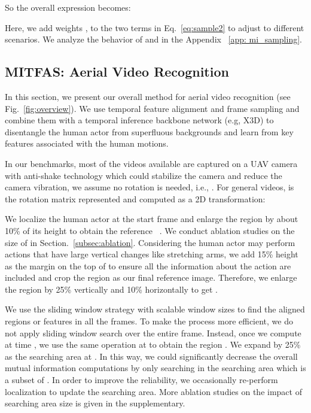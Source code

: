 \documentclass[10pt,twocolumn,letterpaper]{article}
\begin{document}
{So the overall expression becomes:

Here, we add weights , to the two terms in Eq.~\ref{eq:sample2} to adjust to different scenarios. We analyze the behavior of  and  in the Appendix ~\ref{app: mi_sampling}.

\subsection{MITFAS: Aerial Video Recognition} \label{subsec:MITFAS}
In this section, we present our overall method for aerial video recognition (see Fig.~\ref{fig:overview}). We use temporal feature alignment and frame sampling and combine them with a temporal inference backbone network (e.g, X3D\cite{feichtenhofer2020x3d}) to disentangle the human actor from superfluous backgrounds and learn from key features associated with the human motions.



In our benchmarks, most of the videos available are captured on a UAV camera with anti-shake technology which could stabilize the camera and reduce the camera vibration, we assume no rotation is needed, i.e., . For general videos,  is the rotation matrix represented and computed as a 2D transformation:


We localize the human actor at the start frame and enlarge the region by about 10\% of its height to obtain the reference  ~\cite{hasan2021generalizable}. We conduct ablation studies on the size of  in Section.~\ref{subsec:ablation}. Considering the human actor may perform actions that have large vertical changes like stretching arms, we add 15\% height as the margin on the top of  to ensure all the information about the action are included and crop the region as our final reference image. Therefore, we enlarge the region by 25\% vertically and 10\% horizontally to get .

We use the sliding window strategy with scalable window sizes to find the aligned regions or features in all the frames. To make the process more efficient, we do not apply sliding window search over the entire frame. Instead, once we compute  at time , we use the same operation at  to obtain the region . We expand   by 25\% as the searching area at . In this way, we could significantly decrease the overall mutual information computations by only searching in the searching area which is a subset of . In order to improve the reliability, we occasionally re-perform localization to update the searching area. More ablation studies on the impact of searching area size is given in the supplementary.

}
\end{document}
